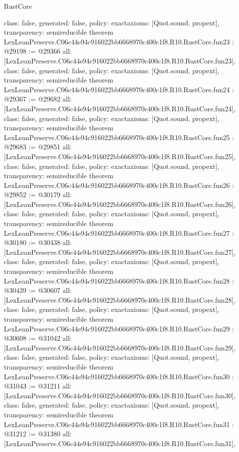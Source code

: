 \begin{lexlean}{RustCore}
\begin{coremodule}
{  class: false,
  generated: false,
  policy: exact{axioms: [Quot.sound, propext]},
  transparency: semireducible
}
theorem LexLeanPreserve.C06c44e94c916022bb6668970c400c1f8.R10.RustCore.fun23 : @29198 := @29366 {
  all: [LexLeanPreserve.C06c44e94c916022bb6668970c400c1f8.R10.RustCore.fun23],
  class: false,
  generated: false,
  policy: exact{axioms: [Quot.sound, propext]},
  transparency: semireducible
}
theorem LexLeanPreserve.C06c44e94c916022bb6668970c400c1f8.R10.RustCore.fun24 : @29367 := @29682 {
  all: [LexLeanPreserve.C06c44e94c916022bb6668970c400c1f8.R10.RustCore.fun24],
  class: false,
  generated: false,
  policy: exact{axioms: [Quot.sound, propext]},
  transparency: semireducible
}
theorem LexLeanPreserve.C06c44e94c916022bb6668970c400c1f8.R10.RustCore.fun25 : @29683 := @29851 {
  all: [LexLeanPreserve.C06c44e94c916022bb6668970c400c1f8.R10.RustCore.fun25],
  class: false,
  generated: false,
  policy: exact{axioms: [Quot.sound, propext]},
  transparency: semireducible
}
theorem LexLeanPreserve.C06c44e94c916022bb6668970c400c1f8.R10.RustCore.fun26 : @29852 := @30179 {
  all: [LexLeanPreserve.C06c44e94c916022bb6668970c400c1f8.R10.RustCore.fun26],
  class: false,
  generated: false,
  policy: exact{axioms: [Quot.sound, propext]},
  transparency: semireducible
}
theorem LexLeanPreserve.C06c44e94c916022bb6668970c400c1f8.R10.RustCore.fun27 : @30180 := @30438 {
  all: [LexLeanPreserve.C06c44e94c916022bb6668970c400c1f8.R10.RustCore.fun27],
  class: false,
  generated: false,
  policy: exact{axioms: [Quot.sound, propext]},
  transparency: semireducible
}
theorem LexLeanPreserve.C06c44e94c916022bb6668970c400c1f8.R10.RustCore.fun28 : @30439 := @30607 {
  all: [LexLeanPreserve.C06c44e94c916022bb6668970c400c1f8.R10.RustCore.fun28],
  class: false,
  generated: false,
  policy: exact{axioms: [Quot.sound, propext]},
  transparency: semireducible
}
theorem LexLeanPreserve.C06c44e94c916022bb6668970c400c1f8.R10.RustCore.fun29 : @30608 := @31042 {
  all: [LexLeanPreserve.C06c44e94c916022bb6668970c400c1f8.R10.RustCore.fun29],
  class: false,
  generated: false,
  policy: exact{axioms: [Quot.sound, propext]},
  transparency: semireducible
}
theorem LexLeanPreserve.C06c44e94c916022bb6668970c400c1f8.R10.RustCore.fun30 : @31043 := @31211 {
  all: [LexLeanPreserve.C06c44e94c916022bb6668970c400c1f8.R10.RustCore.fun30],
  class: false,
  generated: false,
  policy: exact{axioms: [Quot.sound, propext]},
  transparency: semireducible
}
theorem LexLeanPreserve.C06c44e94c916022bb6668970c400c1f8.R10.RustCore.fun31 : @31212 := @31380 {
  all: [LexLeanPreserve.C06c44e94c916022bb6668970c400c1f8.R10.RustCore.fun31],
}
\end{coremodule}
\end{lexlean}
